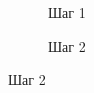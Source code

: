 \begin{figure}[H]
  \centering
  
  \begin{subfigure}[b]{0.45\textwidth}
    \centering
    
    \caption{Шаг 1}

  \end{subfigure}
  \qquad
  \begin{subfigure}[b]{0.45\textwidth}
    \centering
    
    \caption{Шаг 2}

  \end{subfigure}
\end{figure}
